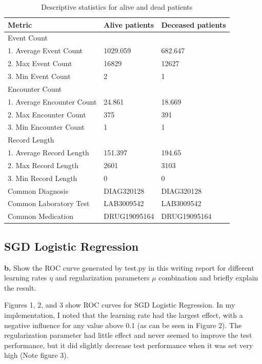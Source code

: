\documentclass[12pt]{article}
\begin{document}
\begin{table}[!h]
\centering
\begin{tabular}{@{}|l|l|l|}
\toprule
Metric & Alive patients & Deceased patients  \\ \hline
Event Count & &  \\
1. Average Event Count & 1029.059 & 682.647 \\
2. Max Event Count  & 16829 & 12627 \\
3. Min Event Count  & 2 & 1 \\ \hline

Encounter Count & &  \\
1. Average Encounter Count  & 24.861  & 18.669  \\
2. Max Encounter Count  & 375  & 391 \\
3. Min Encounter Count  & 1  & 1 \\ \hline

Record Length & &  \\
1. Average Record Length & 151.397  & 194.65  \\
2. Max Record Length& 2601  & 3103  \\
3. Min Record Length& 0  & 0  \\ \hline

Common Diagnosis & DIAG320128  & DIAG320128 \\ \hline

Common Laboratory Test & LAB3009542  & LAB3009542 \\ \hline

Common Medication & DRUG19095164 & DRUG19095164 \\
\bottomrule
\end{tabular}
\caption{Descriptive statistics for alive and dead patients}
\label{tbl:stat}
\end{table}


\subsection{SGD Logistic Regression}
\textbf{b.} Show the ROC curve generated by test.py in this writing report for different learning rates $\eta$ and regularization parameters $\mu$ combination and briefly explain the result.

\vspace{5mm}
Figures 1, 2, and 3 show ROC curves for SGD Logistic Regression.  In my
implementation, I noted that the learning rate had the largest effect, with a
negative influence for any value above 0.1 (as can be seen in Figure 2). The
regularization parameter had little effect and never seemed to improve the test
performance, but it did slightly decrease test performance when it was set very
high (Note figure 3).
\end{document}
